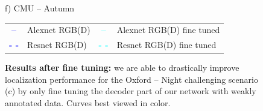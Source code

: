 \begin{figure}
\begin{minipage}{0.27\linewidth}
		f) CMU -- Autumn
	\end{minipage}
	
	\vspace{0.2cm}
		
	\begin{scriptsize}
	\begin{tabular}{c l c l}
		\textcolor{blue}{\textbf{--}} & Alexnet RGB(D) & \textcolor{cyan}{\textbf{--}} & Alexnet RGB(D) fine tuned \\
		\textcolor{blue}{\textbf{- -}} & Resnet RGB(D) & \textcolor{cyan}{\textbf{- -}} & Resnet RGB(D) fine tuned \\
	\end{tabular}		
	\end{scriptsize}
	
	\caption[Results after fine tuning]{\label{fig:ft_night} \textbf{Results after fine tuning:} we are able to drastically improve localization performance for the Oxford -- Night challenging scenario (c) by only fine tuning the decoder part of our network with weakly annotated data. Curves best viewed in color.}
	
\end{figure}
